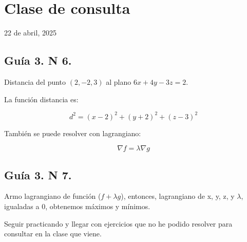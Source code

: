 \section{Clase de consulta}

22 de abril, 2025

\subsection{Guía 3. N 6.}

Distancia del punto \((2,-2,3)\)
al plano \(6x + 4y - 3z = 2\).

La función distancia es:

\begin{equation*}
    d^2 = (x-2)^2 + (y+2)^2 + (z-3)^2
\end{equation*}

También se puede resolver con lagrangiano:

\begin{equation*}
    \nabla f = \lambda\nabla g
\end{equation*}

\subsection{Guía 3. N 7.}

Armo lagrangiano de función (\(f+\lambda g\)),
entonces, lagrangiano de x,
y,
z,
y \(\lambda\),
igualadas a 0,
obtenemos máximos y mínimos.

Seguir practicando y llegar con ejercicios que no he podido resolver para consultar en la clase que viene.